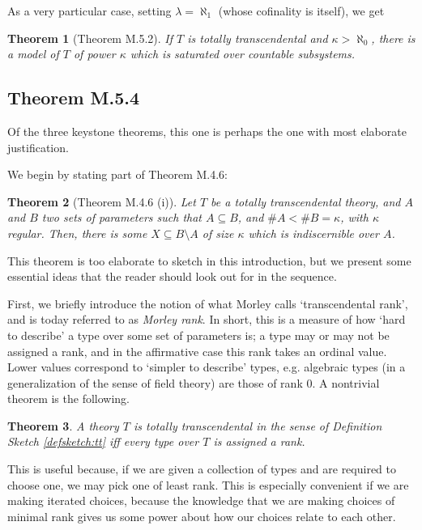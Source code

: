 \documentclass{article}
\newtheorem{theorem}{Theorem}[section]
\theoremstyle{nonumberplain}
\newcommand{\card}[1]{\#{#1}}
\begin{document}
As a very particular case, setting $\lambda = \aleph_1$ (whose cofinality is itself), we get
\begin{theorem}[Theorem M.5.2]
If $T$ is totally transcendental and $\kappa > \aleph_0$, there is a model of $T$ of power $\kappa$ which is saturated over countable subsystems.
\end{theorem}

\subsection{Theorem M.5.4}

Of the three keystone theorems, this one is perhaps the one with most elaborate justification.

We begin by stating part of Theorem M.4.6:

\begin{theorem}[Theorem M.4.6 (i)] \label{thm:intro4.6}
Let $T$ be a totally transcendental theory, and $A$ and $B$ two sets of parameters such that $A \subseteq B$, and $\card A < \card B = \kappa$, with $\kappa$ regular. Then, there is some $X \subseteq B \setminus A$ of size $\kappa$ which is indiscernible over $A$.
\end{theorem}

This theorem is too elaborate to sketch in this introduction, but we present some essential ideas that the reader should look out for in the sequence.

First, we briefly introduce the notion of what Morley calls `transcendental rank', and is today referred to as \emph{Morley rank}. In short, this is a measure of how `hard to describe' a type over some set of parameters is; a type may or may not be assigned a rank, and in the affirmative case this rank takes an ordinal value. Lower values correspond to `simpler to describe' types, e.g. algebraic types (in a generalization of the sense of field theory) are those of rank $0$. A nontrivial theorem is the following.
\begin{theorem}
A theory $T$ is totally transcendental in the sense of Definition Sketch \ref{defsketch:tt} iff every type over $T$ is assigned a rank.
\end{theorem}

This is useful because, if we are given a collection of types and are required to choose one, we may pick one of least rank. This is especially convenient if we are making iterated choices, because the knowledge that we are making choices of minimal rank gives us some power about how our choices relate to each other.
\end{document}
